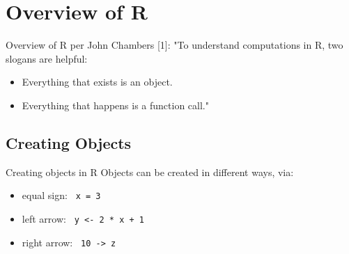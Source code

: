 \section{Overview of R}
\begin{frame}
	\begin{center}
  		\begin{block}{Overview of R per John Chambers [1]:} 
			"To understand computations in R, two slogans are helpful:
			\begin{itemize}
			        \item Everything that exists is an object.
			        \item Everything that happens is a function call."
			\end{itemize}
		\end{block}
	\end{center} 

\end{frame}

\subsection{Creating Objects}
\begin{frame}
		\begin{block}{Creating objects in R}
Objects can be created in different ways, via:
			\begin{itemize}
				\item equal sign: \lstinline$ x = 3 $
				\item left arrow: \lstinline$ y <- 2 * x + 1 $
				\item right arrow: \lstinline$ 10 -> z $
			\end{itemize}
		\end{block}
\end{frame}

